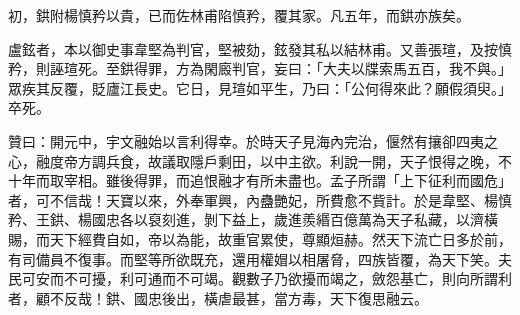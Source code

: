 \begin{pinyinscope}
 初，鉷附楊慎矜以貴，已而佐林甫陷慎矜，覆其家。凡五年，而鉷亦族矣。



 盧鉉者，本以御史事韋堅為判官，堅被劾，鉉發其私以結林甫。又善張瑄，及按慎矜，則誣瑄死。至鉷得罪，方為閑廄判官，妄曰：「大夫以牒索馬五百，我不與。」眾疾其反覆，貶廬江長史。它日，見瑄如平生，乃曰：「公何得來此？願假須臾。」卒死。



 贊曰：開元中，宇文融始以言利得幸。於時天子見海內完治，偃然有攘卻四夷之心，融度帝方調兵食，故議取隱戶剩田，以中主欲。利說一開，天子恨得之晚，不十年而取宰相。雖後得罪，而追恨融才有所未盡也。孟子所謂「上下征利而國危」者，可不信哉！天寶以來，外奉軍興，內蠱艷妃，所費愈不貲計。於是韋堅、楊慎矜、王鉷、楊國忠各以裒刻進，剝下益上，歲進羨緡百億萬為天子私藏，以濟橫賜，而天下經費自如，帝以為能，故重官累使，尊顯烜赫。然天下流亡日多於前，有司備員不復事。而堅等所欲既充，還用權媢以相屠脅，四族皆覆，為天下笑。夫民可安而不可擾，利可通而不可竭。觀數子乃欲擾而竭之，斂怨基亡，則向所謂利者，顧不反哉！鉷、國忠後出，橫虐最甚，當方毒，天下復思融云。



\end{pinyinscope}
